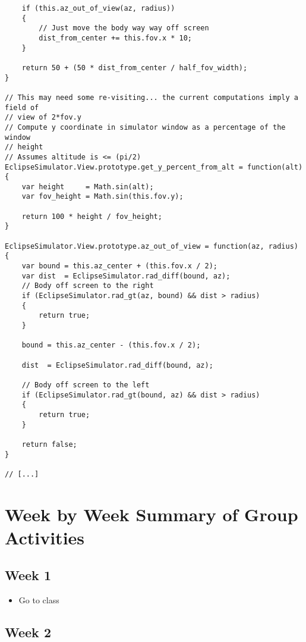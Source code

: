 \documentclass[10pt, onecolumn, draftclsnofoot, letterpaper, compsoc]{IEEEtran}
\begin{document}
\begin{verbatim}
    if (this.az_out_of_view(az, radius))
    {
        // Just move the body way way off screen
        dist_from_center += this.fov.x * 10;
    }

    return 50 + (50 * dist_from_center / half_fov_width);
}

// This may need some re-visiting... the current computations imply a field of
// view of 2*fov.y
// Compute y coordinate in simulator window as a percentage of the window 
// height
// Assumes altitude is <= (pi/2)
EclipseSimulator.View.prototype.get_y_percent_from_alt = function(alt)
{
    var height     = Math.sin(alt);
    var fov_height = Math.sin(this.fov.y);

    return 100 * height / fov_height;
}

EclipseSimulator.View.prototype.az_out_of_view = function(az, radius)
{
    var bound = this.az_center + (this.fov.x / 2);
    var dist  = EclipseSimulator.rad_diff(bound, az);
    // Body off screen to the right
    if (EclipseSimulator.rad_gt(az, bound) && dist > radius)
    {
        return true;
    }

    bound = this.az_center - (this.fov.x / 2);
    
    dist  = EclipseSimulator.rad_diff(bound, az);
    
    // Body off screen to the left
    if (EclipseSimulator.rad_gt(bound, az) && dist > radius)
    {
        return true;
    }
    
    return false;
}

// [...]
\end{verbatim}

\section{Week by Week Summary of Group Activities}

\subsection{Week 1}

    \begin{itemize}

    \item Go to class

    \end{itemize}

\subsection{Week 2}
\end{document}
